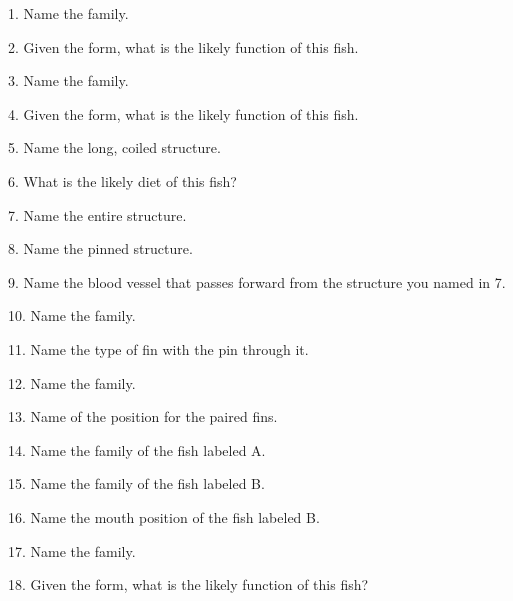 \documentclass{article}
\begin{document}
{\Large 
1. Name the family.
\vspace{1\baselineskip}

2. Given the form, what is the likely function of this fish.
\vspace{2\baselineskip}
%


3. Name the family.
\vspace{1\baselineskip}

4. Given the form, what is the likely function of this fish.
\vspace{2\baselineskip}
%


5. Name the long, coiled structure.
\vspace{1\baselineskip}

6. What is the likely diet of this fish?
\vspace{2\baselineskip}
%


7. Name the entire structure.
\vspace{1\baselineskip}

8. Name the pinned structure.
\vspace{1\baselineskip}

9. Name the blood vessel that passes forward from the structure you named in 7.
\vspace{2\baselineskip}


10. Name the family.
\vspace{1\baselineskip}

11. Name the type of fin with the pin through it.
\vspace{2\baselineskip}
%


12. Name the family.
\vspace{1\baselineskip}

13. Name of the position for the paired fins.
\vspace{2\baselineskip}
%

14. Name the family of the fish labeled A.
\vspace{1\baselineskip}

15. Name the family of the fish labeled B.
\vspace{1\baselineskip}

16. Name the mouth position of the fish labeled B.
\vspace{2\baselineskip}

%

17. Name the family.
\vspace{1\baselineskip}

18. Given the form, what is the likely function of this fish?
\vspace{2\baselineskip}
%


}
\end{document}
